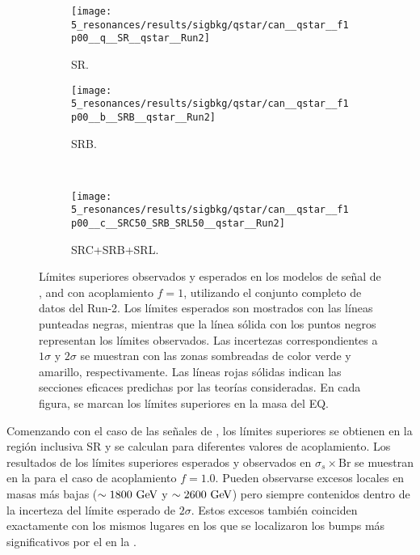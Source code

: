 \begin{figure}[ht!]
    \centering
    \begin{subfigure}[t]{0.49\linewidth}
        \centering
        \texttt{[image: 5\_resonances/results/sigbkg/qstar/can\_\_qstar\_\_f1p00\_\_q\_\_SR\_\_qstar\_\_Run2]}
        \caption{SR.}
        \label{fig:results:results:bkgsig:results:qstar:limits:SR}
    \end{subfigure}
    \hfill
    \begin{subfigure}[t]{0.49\linewidth}
        \centering
        \texttt{[image: 5\_resonances/results/sigbkg/qstar/can\_\_qstar\_\_f1p00\_\_b\_\_SRB\_\_qstar\_\_Run2]}
        \caption{SRB.}
        \label{fig:results:results:bkgsig:results:qstar:limits:SRB}
    \end{subfigure}\\
    \begin{subfigure}[t]{0.49\linewidth}
        \centering
        \texttt{[image: 5\_resonances/results/sigbkg/qstar/can\_\_qstar\_\_f1p00\_\_c\_\_SRC50\_SRB\_SRL50\_\_qstar\_\_Run2]}
        \caption{SRC+SRB+SRL.}
        \label{fig:results:results:bkgsig:results:qstar:limits:SRC}
    \end{subfigure}
    \caption{Límites superiores observados y esperados en los modelos de señal de \qstar, \cstar and \bstar con acoplamiento \(f=1\), utilizando el conjunto completo de datos del Run-2. Los límites esperados son mostrados con las líneas punteadas negras, mientras que la línea sólida con los puntos negros representan los límites observados. Las incertezas correspondientes a \(1\sigma\) y \(2\sigma\) se muestran con las zonas sombreadas de color verde y amarillo, respectivamente. Las líneas rojas sólidas indican las secciones eficaces predichas por las teorías consideradas. En cada figura, se marcan los límites superiores en la masa del \ac{EQ}.}
    \label{fig:results:results:bkgsig:results:qstar:limits}
\end{figure}

Comenzando con el caso de las señales de \qstar, los límites superiores se obtienen en la región inclusiva SR y se calculan para diferentes valores de acoplamiento. Los resultados de los límites superiores esperados y observados en \(\sigma_s \times \text{Br}\) se muestran en la \Fig{\ref{fig:results:results:bkgsig:results:qstar:limits:SR}} para el caso de acoplamiento \(f=1.0\). Pueden observarse excesos locales en masas más bajas (\(\sim 1800~\text{GeV}\) y \(\sim 2600~\text{GeV}\)) pero siempre contenidos dentro de la incerteza del límite esperado de \(2\sigma\). Estos excesos también coinciden exactamente con los mismos lugares en los que se localizaron los bumps más significativos por el \bh en la \Fig{\ref{fig:results:results:bkgonly:fits:SR}}.

